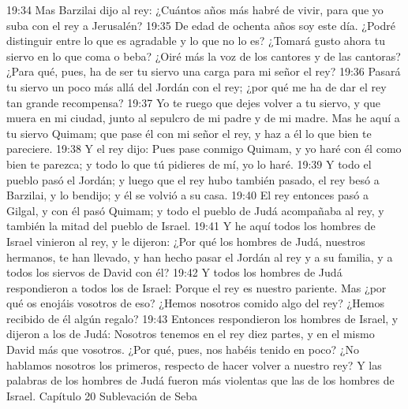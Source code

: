 19:34 Mas Barzilai dijo al rey: ¿Cuántos años más habré de vivir, para que yo suba con el rey a Jerusalén?  
19:35 De edad de ochenta años soy este día. ¿Podré distinguir entre lo que es agradable y lo que no lo es? ¿Tomará gusto ahora tu siervo en lo que coma o beba? ¿Oiré más la voz de los cantores y de las cantoras? ¿Para qué, pues, ha de ser tu siervo una carga para mi señor el rey?  
19:36 Pasará tu siervo un poco más allá del Jordán con el rey; ¿por qué me ha de dar el rey tan grande recompensa?  
19:37 Yo te ruego que dejes volver a tu siervo, y que muera en mi ciudad, junto al sepulcro de mi padre y de mi madre. Mas he aquí a tu siervo Quimam; que pase él con mi señor el rey, y haz a él lo que bien te pareciere.  
19:38 Y el rey dijo: Pues pase conmigo Quimam, y yo haré con él como bien te parezca; y todo lo que tú pidieres de mí, yo lo haré.  
19:39 Y todo el pueblo pasó el Jordán; y luego que el rey hubo también pasado, el rey besó a Barzilai, y lo bendijo; y él se volvió a su casa.  
19:40 El rey entonces pasó a Gilgal, y con él pasó Quimam; y todo el pueblo de Judá acompañaba al rey, y también la mitad del pueblo de Israel.  
19:41 Y he aquí todos los hombres de Israel vinieron al rey, y le dijeron: ¿Por qué los hombres de Judá, nuestros hermanos, te han llevado, y han hecho pasar el Jordán al rey y a su familia, y a todos los siervos de David con él?  
19:42 Y todos los hombres de Judá respondieron a todos los de Israel: Porque el rey es nuestro pariente. Mas ¿por qué os enojáis vosotros de eso? ¿Hemos nosotros comido algo del rey? ¿Hemos recibido de él algún regalo?  
19:43 Entonces respondieron los hombres de Israel, y dijeron a los de Judá: Nosotros tenemos en el rey diez partes, y en el mismo David más que vosotros. ¿Por qué, pues, nos habéis tenido en poco? ¿No hablamos nosotros los primeros, respecto de hacer volver a nuestro rey? Y las palabras de los hombres de Judá fueron más violentas que las de los hombres de Israel.  
Capítulo 20
Sublevación de Seba  

